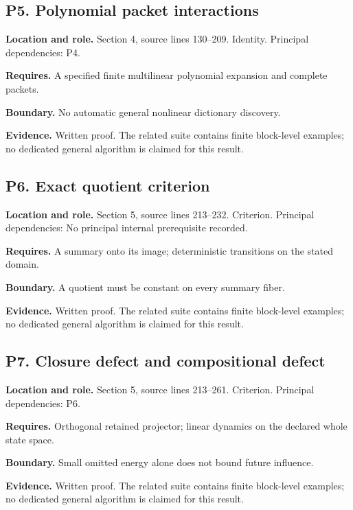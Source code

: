 \documentclass[11pt,oneside,openany]{book}
\numberwithin{equation}{section}
\begin{document}
\par\noindent\begin{minipage}{\textwidth}
\subsection{P5. Polynomial packet
interactions}\label{LSMRegister:p5.-polynomial-packet-interactions}

\textbf{Location and role.} Section 4, source lines 130--209. Identity.
Principal dependencies: P4.

\textbf{Requires.} A specified finite multilinear polynomial expansion
and complete packets.

\textbf{Boundary.} No automatic general nonlinear dictionary discovery.

\textbf{Evidence.} Written proof. The related suite contains finite
block-level examples; no dedicated general algorithm is claimed for this
result.
\end{minipage}\par\medskip

\par\noindent\begin{minipage}{\textwidth}
\subsection{P6. Exact quotient
criterion}\label{LSMRegister:p6.-exact-quotient-criterion}

\textbf{Location and role.} Section 5, source lines 213--232. Criterion.
Principal dependencies: No principal internal prerequisite recorded.

\textbf{Requires.} A summary onto its image; deterministic transitions
on the stated domain.

\textbf{Boundary.} A quotient must be constant on every summary fiber.

\textbf{Evidence.} Written proof. The related suite contains finite
block-level examples; no dedicated general algorithm is claimed for this
result.
\end{minipage}\par\medskip

\par\noindent\begin{minipage}{\textwidth}
\subsection{P7. Closure defect and compositional
defect}\label{LSMRegister:p7.-closure-defect-and-compositional-defect}

\textbf{Location and role.} Section 5, source lines 213--261. Criterion.
Principal dependencies: P6.

\textbf{Requires.} Orthogonal retained projector; linear dynamics on the
declared whole state space.

\textbf{Boundary.} Small omitted energy alone does not bound future
influence.

\textbf{Evidence.} Written proof. The related suite contains finite
block-level examples; no dedicated general algorithm is claimed for this
result.
\end{minipage}\par\medskip
\end{document}
